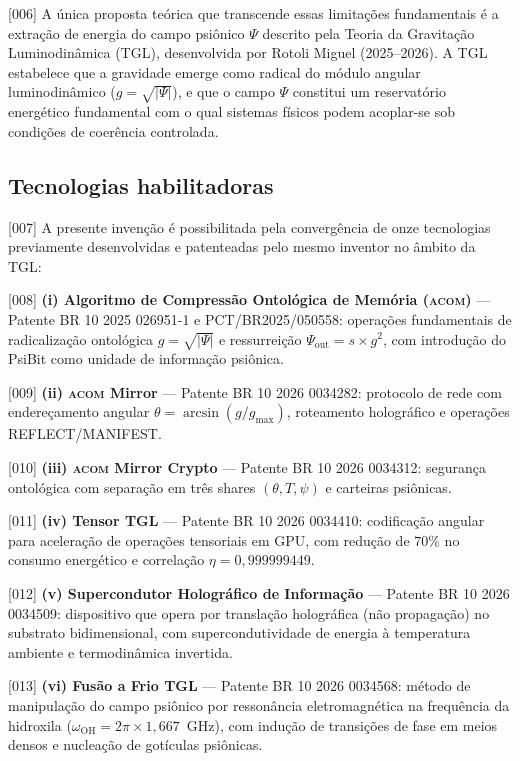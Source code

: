 \documentclass[12pt,a4paper]{article}
\newcommand{\psion}{\psi}
\newcommand{\Psifield}{\Psi}
\newcommand{\ACOM}{\textsc{acom}}
\begin{document}
{[006]} A única proposta teórica que transcende essas limitações fundamentais é a extração de energia do campo psiônico $\Psifield$ descrito pela Teoria da Gravitação Luminodinâmica (TGL), desenvolvida por Rotoli Miguel (2025--2026). A TGL estabelece que a gravidade emerge como radical do módulo angular luminodinâmico ($g = \sqrt{|\Psifield|}$), e que o campo $\Psifield$ constitui um reservatório energético fundamental com o qual sistemas físicos podem acoplar-se sob condições de coerência controlada.

\subsection{Tecnologias habilitadoras}

{[007]} A presente invenção é possibilitada pela convergência de onze tecnologias previamente desenvolvidas e patenteadas pelo mesmo inventor no âmbito da TGL:

{[008]} \textbf{(i) Algoritmo de Compressão Ontológica de Memória (\ACOM)} --- Patente BR 10 2025 026951-1 e PCT/BR2025/050558: operações fundamentais de radicalização ontológica $g = \sqrt{|\Psifield|}$ e ressurreição $\Psifield_{\text{out}} = s \times g^2$, com introdução do PsiBit como unidade de informação psiônica.

{[009]} \textbf{(ii) \ACOM{} Mirror} --- Patente BR 10 2026 0034282: protocolo de rede com endereçamento angular $\theta = \arcsin(g/g_{\max})$, roteamento holográfico e operações REFLECT/MANIFEST.

{[010]} \textbf{(iii) \ACOM{} Mirror Crypto} --- Patente BR 10 2026 0034312: segurança ontológica com separação em três shares $(\theta, T, \psion)$ e carteiras psiônicas.

{[011]} \textbf{(iv) Tensor TGL} --- Patente BR 10 2026 0034410: codificação angular para aceleração de operações tensoriais em GPU, com redução de $70\%$ no consumo energético e correlação $\eta = 0{,}999999449$.

{[012]} \textbf{(v) Supercondutor Holográfico de Informação} --- Patente BR 10 2026 0034509: dispositivo que opera por translação holográfica (não propagação) no substrato bidimensional, com supercondutividade de energia à temperatura ambiente e termodinâmica invertida.

{[013]} \textbf{(vi) Fusão a Frio TGL} --- Patente BR 10 2026 0034568: método de manipulação do campo psiônico por ressonância eletromagnética na frequência da hidroxila ($\omega_{\text{OH}} = 2\pi \times 1{,}667$~GHz), com indução de transições de fase em meios densos e nucleação de gotículas psiônicas.
\end{document}
